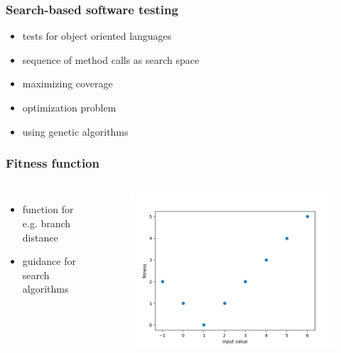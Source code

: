 \begin{frame}
	\frametitle{Search-based software testing}
	
	\begin{itemize}
		\item tests for object oriented languages
		\item sequence of method calls as search space
		\item maximizing coverage
		\item optimization problem
		\item using genetic algorithms
	\end{itemize}
			
	
\end{frame}

\begin{frame}
	\frametitle{Fitness function}
	
	\begin{columns}[c]
		

		\begin{itemize}
			\item function for e.g. branch distance
			\item guidance for search algorithms
		\end{itemize}
		
		\begin{figure}
			\includegraphics[width=1\textwidth]{figures/plot_guidance}
		\end{figure}
		
		

	\end{columns}
	
\end{frame}

